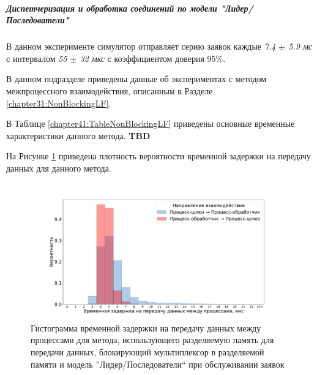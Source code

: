 \subparagraph{Диспетчеризация и обработка соединений по модели "Лидер/Последователи"}

В данном эксперименте симулятор отправляет серию заявок каждые \textit{7.4 $\pm$ 5.9 мс} с интервалом \textit{55 $\pm$ 32 мкс} с коэффициентом доверия 95\%.

В данном подразделе приведены данные об экспериментах с методом межпроцессного взаимодействия, описанным в Разделе \ref{chapter31:NonBlockingLF}.

В Таблице \ref{chapter41:TableNonBlockingLF} приведены основные временные характеристики данного метода. \textbf{TBD}

На Рисунке \ref{chapter41:FigNonBlockingLF} приведена плотность вероятности временной задержки на передачу данных для данного метода.

\begin{figure}[!h]
\caption{Гистограмма временной задержки на передачу данных между процессами для метода, использующего разделяемую память для передачи данных, блокирующий мультиплексор в разделяемой памяти и модель ''Лидер/Последователи`` при обслуживании заявок}
\label{chapter41:FigNonBlockingLF}
\includegraphics[width=\textwidth]{../../graphics/hist/NonBlockingLF}
\end{figure}
%

